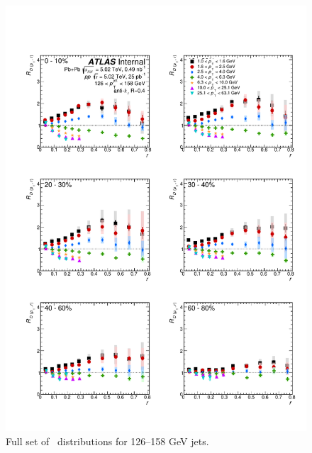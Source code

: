 \begin{figure}[h]
\includegraphics[width=1.0\textwidth]{figures/results/RDpT_dR_jet7.pdf}
\caption{Full set of \RDptr\ distributions for 126--158 GeV jets.}
\label{fig:fullset_rptr_j7}
\end{figure}

